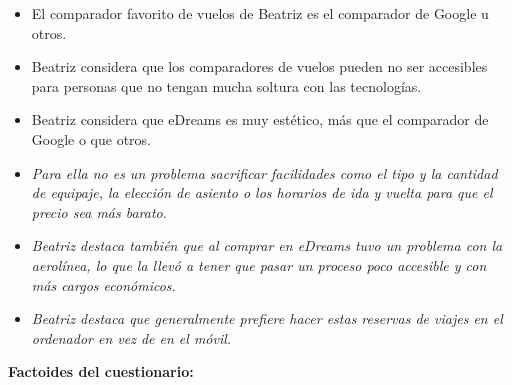 \begin{itemize}
    \item El comparador favorito de vuelos de Beatriz es el comparador de Google u otros.
    \item Beatriz considera que los comparadores de vuelos pueden no ser accesibles para personas que no tengan mucha soltura con las tecnologías.
    \item Beatriz considera que eDreams es muy estético, más que el comparador de Google o que otros.
    \item \textit{Para ella no es un problema sacrificar facilidades como el tipo y la cantidad de equipaje, la elección de asiento o los horarios de ida y vuelta para que el precio sea más barato}.
    \item \textit{Beatriz destaca también que al comprar en eDreams tuvo un problema con la aerolínea, lo que la llevó a tener que pasar un proceso poco accesible y con más cargos económicos.}
    \item \textit{Beatriz destaca que generalmente prefiere hacer estas reservas de viajes en el ordenador en vez de en el móvil.}
\end{itemize}


\textbf{Factoides del cuestionario:}

